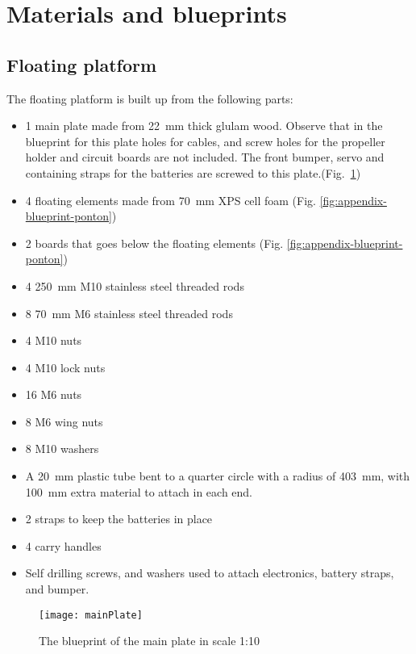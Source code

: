   \section{Materials and blueprints}\label{sec:appendix-a}

\subsection{Floating platform}

The floating platform is built up from the following parts:

\begin{itemize}
  \item 1 main plate made  from 22~mm thick glulam wood. Observe that in the
    blueprint for this plate holes for cables, and screw holes for the
    propeller holder and circuit boards are not included. The front bumper,
    servo and containing straps for the batteries are screwed to this plate.(Fig.~\ref{fig:appendix-blueprint-main-plate})
  \item 4 floating elements made from 70~mm XPS cell foam (Fig. \ref{fig:appendix-blueprint-ponton})
  \item 2 boards that goes below the floating elements (Fig. \ref{fig:appendix-blueprint-ponton})
  \item 4 250~mm M10 stainless steel threaded rods
  \item 8 70~mm M6 stainless steel threaded rods
  \item 4 M10 nuts
  \item 4 M10 lock nuts
  \item 16 M6 nuts
  \item 8 M6 wing nuts
  \item 8 M10 washers
  \item A 20~mm plastic tube bent to a quarter circle with a radius of 403~mm,
    with 100~mm extra material to attach in each end.
  \item 2 straps to keep the batteries in place
  \item 4 carry handles
  \item Self drilling screws, and washers used to attach electronics, battery
    straps, and bumper.
  \end{itemize}

  \begin{figure}
    \centering
    \texttt{[image: mainPlate]}

    \caption{The blueprint of the main plate in scale 1:10}
    \label{fig:appendix-blueprint-main-plate}
\end{figure}


